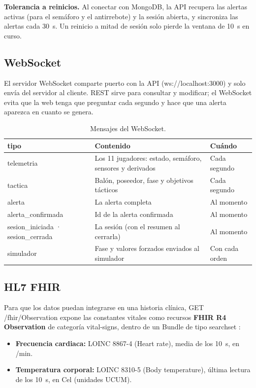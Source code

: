 \documentclass[runningheads]{llncs}
\begin{document}
\textbf{Tolerancia a reinicios.} Al conectar con MongoDB, la API recupera las alertas activas (para el semáforo y el antirrebote) y la sesión abierta, y sincroniza las alertas cada 30~s. Un reinicio a mitad de sesión solo pierde la ventana de 10~s en curso.

\subsection{WebSocket}

El servidor WebSocket comparte puerto con la API (ws://localhost:3000) y solo envía del servidor al cliente. REST sirve para consultar y modificar; el WebSocket evita que la web tenga que preguntar cada segundo y hace que una alerta aparezca en cuanto se genera.

\begin{table}[!htbp]
\centering
\caption{Mensajes del WebSocket.}\label{tab:ws}
\footnotesize
\begin{tabularx}{\textwidth}{p{4cm}Lp{2cm}}
\toprule
\textbf{tipo} & \textbf{Contenido} & \textbf{Cuándo} \\
\midrule
telemetria & Los 11 jugadores: estado, semáforo, sensores y derivados & Cada segundo \\
tactica & Balón, poseedor, fase y objetivos tácticos & Cada segundo \\
alerta & La alerta completa & Al momento \\
alerta\_confirmada & Id de la alerta confirmada & Al momento \\
sesion\_iniciada · sesion\_cerrada & La sesión (con el resumen al cerrarla) & Al momento \\
simulador & Fase y valores forzados enviados al simulador & Con cada orden \\
\bottomrule
\end{tabularx}
\end{table}

\subsection{HL7 FHIR}

Para que los datos puedan integrarse en una historia clínica, GET /fhir/Observation expone las constantes vitales como recursos \textbf{FHIR R4 Observation} de categoría vital-signs, dentro de un Bundle de tipo searchset \cite{fhir}:

\begin{itemize}
  \item \textbf{Frecuencia cardiaca:} LOINC 8867-4 (Heart rate), media de los 10~s, en /min.
  \item \textbf{Temperatura corporal:} LOINC 8310-5 (Body temperature), última lectura de los 10~s, en Cel (unidades UCUM).
\end{itemize}
\end{document}
